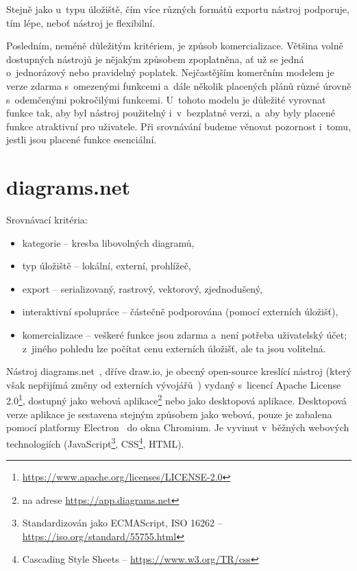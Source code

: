 Stejně jako u~typu úložiště, čím více různých formátů exportu nástroj podporuje, tím lépe, neboť nástroj je flexibilní.

Posledním, neméně důležitým kritériem, je způsob komercializace.
Většina volně dostupných nástrojů je nějakým způsobem zpoplatněna, ať už se jedná o~jednorázový nebo pravidelný poplatek.
Nejčastějším komerčním modelem je verze zdarma s~omezenými funkcemi a~dále několik placených plánů různé úrovně s~odemčenými pokročilými funkcemi.
U~tohoto modelu je důležité vyrovnat funkce tak, aby byl nástroj použitelný i~v~bezplatné verzi, a~aby byly placené funkce atraktivní pro uživatele.
Při srovnávání budeme věnovat pozornost i~tomu, jestli jsou placené funkce esenciální.

\section{diagrams.net}\label{section:digramsnet}

Srovnávací kritéria:
\begin{itemize}
  \item kategorie -- kresba libovolných diagramů,
  \item typ úložiště -- lokální, externí, prohlížeč,
  \item export -- serializovaný, rastrový, vektorový, zjednodušený,
  \item interaktivní spolupráce -- částečně podporována (pomocí externích úložišť),
  \item komercializace -- veškeré funkce jsou zdarma a~není potřeba uživatelský účet;
        z~jiného pohledu lze počítat cenu externích úložišť, ale ta jsou volitelná.
\end{itemize}

Nástroj diagrams.net~\cite{diagramsnet21}, dříve draw.io, je obecný open-source kreslící nástroj
(který však nepřijímá změny od externích vývojářů~\cite{drawio22}) %
vydaný s~licencí Apache License 2.0\footnote{\url{https://www.apache.org/licenses/LICENSE-2.0}}, dostupný jako webová aplikace\footnote{na adrese \url{https://app.diagrams.net}} nebo jako desktopová aplikace.
Desktopová verze aplikace je sestavena stejným způsobem jako webová, pouze je zabalena pomocí platformy Electron~\cite{electron21} do okna Chromium.
Je vyvinut v~běžných we\-bo\-vých tech\-no\-lo\-gi\-ích (Java\-Script\footnote{Standardizován jako ECMAScript, ISO 16262 -- \url{https://iso.org/standard/55755.html}}, CSS\footnote{Cascading Style Sheets -- \url{https://www.w3.org/TR/css}}, HTML).

